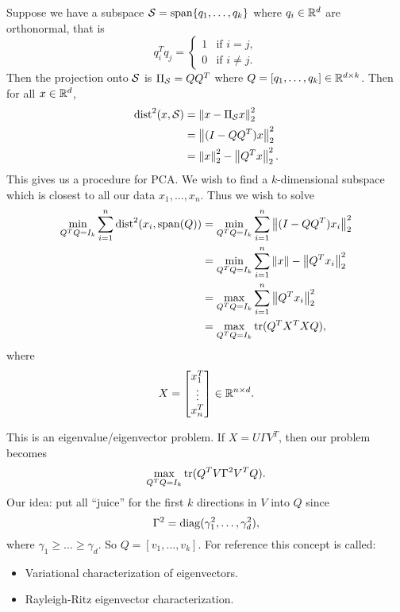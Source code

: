 Suppose we have a subspace $\mathcal{S} = \operatorname{span}\{q_1,\ldots, q_k\}$ where $q_i \in {\mathbb R}^d$ are orthonormal, that is
\[q_i^Tq_j = \begin{cases}
    1 & \text{if } i = j,\\
    0 & \text{if } i \neq j.
\end{cases} \]
Then the projection onto $\mathcal{S}$ is $\Pi_{\mathcal{S}} = QQ^T$ where $Q = [q_1,\ldots,q_k] \in {\mathbb R}^{d \times k}$. Then for all $x \in {\mathbb R}^d$,
\begin{align*}
    \text{dist}^2(x,\mathcal{S}) &= \left\|x-\Pi_{\mathcal{S}} x\right\|_2^2\\
    &= \left\|(I-QQ^T)x\right\|_2^2\\
    &=\left\|x\right\|_2^2-\left\|Q^Tx\right\|_2^2.
\end{align*}
This gives us a procedure for PCA. We wish to find a $k$-dimensional subspace which is closest to all our data $x_1,\ldots, x_n$. Thus we wish to solve
\begin{align*}
    \min_{Q^TQ = I_k} \sum_{i=1}^n \text{dist}^2(x_i, \operatorname{span}(Q)) &=\min_{Q^TQ=I_k}\sum_{i=1}^n \left\|(I-QQ^T)x_i\right\|_2^2\\
    &=\min_{Q^TQ=I_k}\sum_{i=1}^n \left\|x\right\|-\left\|Q^Tx_i\right\|_2^2\\
    &=\max_{Q^TQ = I_k}\sum_{i=1}^n \left\|Q^T x_i\right\|_2^2 \\
    &= \max_{Q^TQ=I_k} \operatorname*{tr}(Q^TX^TXQ),
\end{align*}
where 
\[X = \begin{bmatrix}
    x_1^T\\\vdots \\ x_n^T 
\end{bmatrix} \in {\mathbb R}^{n \times d}.\]
\begin{remark}
    This is an eigenvalue/eigenvector problem. If $X = U\Gamma V^T$, then our problem becomes 
    \[\max_{Q^TQ = I_k} \operatorname*{tr}(Q^TV\Gamma^2 V^T Q). \]
    Our idea: put all ``juice'' for the first $k$ directions in $V$ into $Q$ since 
    \[\Gamma^2 = \operatorname*{diag}(\gamma_1^2,\ldots, \gamma_d^2), \]
    where $\gamma_1 \ge \ldots \ge \gamma_d$. So $Q=[v_1,\ldots, v_k]$. For reference this concept is called:
    \begin{itemize}
        \item Variational characterization of eigenvectors.
        \item Rayleigh-Ritz eigenvector characterization.
    \end{itemize}
\end{remark}
